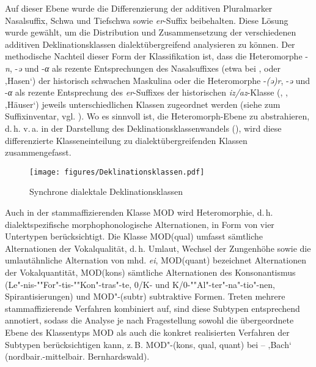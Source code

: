 Auf dieser Ebene wurde die Differenzierung der additiven Pluralmarker Nasalsuffix, Schwa und Tiefschwa sowie \textit{er}{}-Suffix beibehalten. Diese Lösung wurde gewählt, um die Distribution und Zusammensetzung der verschiedenen additiven Deklinationsklassen dialektübergreifend analysieren zu können. Der methodische Nachteil dieser Form der Klassifikation ist, dass die Heteromorphe \mbox{-\textit{n}}, -\textit{ə} und -\textit{α} als rezente Entsprechungen des Nasalsuffixes (etwa bei ,  oder  ‚Hasen‘) der his\-to\-risch schwachen Maskulina oder die Heteromorphe -\textit{(ə)r}, -\textit{ə} und -\textit{α} als rezente Entsprechung des \textit{er}{}-Suffixes der his\-to\-rischen \textit{iz/az}{}-Klasse (, ,  ‚Häuser‘) jeweils unterschiedlichen Klassen zugeordnet werden (siehe  zum Suffixinventar, vgl. \citealt[129]{Rowley1997}). Wo es sinnvoll ist, die Heteromorph-Ebene zu abstrahieren, d.\,h. v.\,a. in der Darstellung des Deklinationsklassenwandels (), wird diese differenzierte Klasseneinteilung zu dialektübergreifenden Klassen zusammengefasst.


\begin{figure}
\texttt{[image: figures/Deklinationsklassen.pdf]}
\caption{Synchrone dialektale Deklinationsklassen}
\label{fig:11}
\end{figure}

Auch in der stammaffizierenden Klasse MOD wird Heteromorphie, d.\,h. dialektspezifische morphophonologische Alternationen, in Form von vier Untertypen berücksichtigt. Die Klasse MOD(qual) umfasst sämtliche Alternationen der Vokalqualität, d.\,h. Umlaut, Wechsel der Zungenhöhe sowie die umlautähnliche Alternation von mhd. \textit{ei}, MOD(quant) bezeichnet Alternationen der Vokalquantität, MOD(kons) sämtliche Alternationen des Konsonantismus (Le"-nis-""For"-tis-""Kon"-tras"-te, 0/K- und K/0-""Al"-ter"-na"-tio"-nen, Spirantisierungen) und MOD"-(subtr) subtraktive Formen. Treten mehrere stammaffizierende Verfahren kombiniert auf, sind diese Subtypen entsprechend annotiert, sodass die Analyse je nach Fragestellung sowohl die übergeordnete Ebene des Klassentyps MOD als auch die konkret realisierten Verfahren der Subtypen berücksichtigen kann, z.\,B. MOD"-(kons, qual, quant) bei  --  ‚Bach‘ (nordbair.-mittelbair. Bernhardswald).

